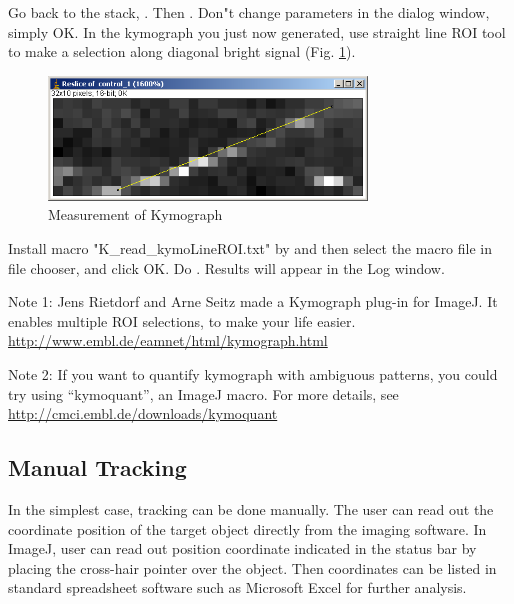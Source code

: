 \begin{indentexercise}{1}
Go back to the stack, . Then . Don"t change parameters in the dialog window, simply OK. In the kymograph you just now generated, use straight line ROI tool to make a selection along diagonal bright signal (Fig. \ref{fig:img134}). 

\begin{figure}[htbp]
\begin{center}
\includegraphics[width=8.467cm,height=3.307cm]{fig/CMCIBasicCourse201102-img134.png}
\caption{ Measurement of Kymograph}
\label{fig:img134}
\end{center}
\end{figure}

Install macro "K\_read\_kymoLineROI.txt" by  and then select the macro file in file chooser, and click OK.
Do . Results will
appear in the Log window.

Note 1: Jens Rietdorf and Arne Seitz made a Kymograph plug-in for ImageJ. It
enables multiple ROI selections, to make your life easier. \\
\url{http://www.embl.de/eamnet/html/kymograph.html}

Note 2: If you want to quantify kymograph with ambiguous patterns, you could try
using ``kymoquant'', an ImageJ macro.
For more details, see
\url{http://cmci.embl.de/downloads/kymoquant}

\end{indentexercise}

\subsection{Manual Tracking}
\label{subsubsec:manualtracker}

In the simplest case, tracking can be done manually. The user can read
out the coordinate position of the target object directly from the
imaging software. In ImageJ, user can read out position coordinate
indicated in the status bar by placing the cross-hair pointer over the
object. Then coordinates can be listed in standard spreadsheet software
such as Microsoft Excel for further analysis. 


